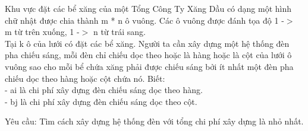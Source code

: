 Khu vực đặt các bể xăng của một Tổng Công Ty Xăng Dầu có dạng một hình chữ nhật được chia thành m * n ô vuông. Các ô vuông được đánh tọa độ 1 -$>$ m từ trên xuống, 1 -$>$ n từ trái sang.   
\\   Tại k ô của lưới có đặt các bể xăng. Người ta cần xây dựng một hệ thống đèn pha chiếu sáng, mỗi đèn chỉ chiếu dọc theo hoặc là hàng hoặc là cột của lưới ô vuông sao cho mỗi bể chứa xăng phải được chiếu sáng bởi ít nhất một đèn pha chiếu dọc theo hàng hoặc cột chứa nó. Biết:   
\\   - ai là chi phí xây dựng đèn chiếu sáng dọc theo hàng.   
\\   - bj là chi phí xây dựng đèn chiếu sáng dọc theo cột.  

       Yêu cầu:      Tìm cách xây dựng hệ thống đèn với tổng chi phí xây dựng là nhỏ nhất.